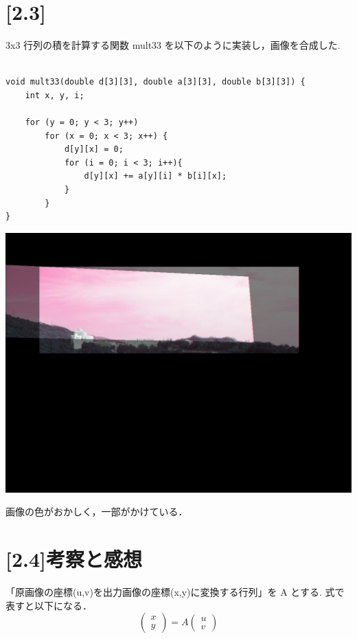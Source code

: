 \documentclass[11pt]{jarticle}
\begin{document}
\section{[2.3]}

3x3 行列の積を計算する関数 mult33 を以下のように実装し，画像を合成した.

\begin{lstlisting}
    
void mult33(double d[3][3], double a[3][3], double b[3][3]) {
	int x, y, i;

	for (y = 0; y < 3; y++)
		for (x = 0; x < 3; x++) {
			d[y][x] = 0;
			for (i = 0; i < 3; i++){
				d[y][x] += a[y][i] * b[i][x];
			}
		}
}
\end{lstlisting}

\includegraphics[scale=.5]{./img/out.jpg}

画像の色がおかしく，一部がかけている．

\section{[2.4]考察と感想}
「原画像の座標(u,v)を出力画像の座標(x,y)に変換する行列」を A とする.
式で表すと以下になる．
\[
    \left(
        \begin{array}{c}
           x \\
           y 
        \end{array}
      \right)
      =A
    \left(
    \begin{array}{c}
       u \\
       v 
    \end{array}
  \right)
\]
\end{document}
